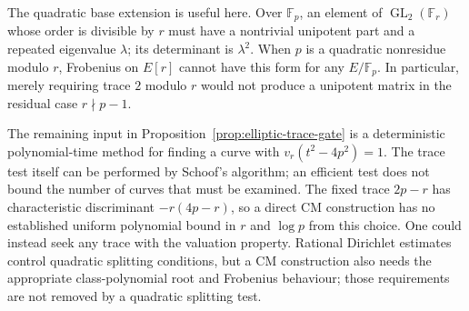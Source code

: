 \documentclass[11pt]{article}
\theoremstyle{definition}
\theoremstyle{remark}
\begin{document}
The quadratic base extension is useful here.
Over $\mathbb F_p$, an element of $\operatorname{GL}_2(\mathbb F_r)$
whose order is divisible by $r$ must have a nontrivial unipotent
part and a repeated eigenvalue $\lambda$; its determinant is
$\lambda^2$.
When $p$ is a quadratic nonresidue modulo $r$, Frobenius on
$E[r]$ cannot have this form for any $E/\mathbb F_p$.
In particular, merely requiring trace $2$ modulo $r$ would not
produce a unipotent matrix in the residual case $r\nmid p-1$.

The remaining input in Proposition~\ref{prop:elliptic-trace-gate} is
a deterministic polynomial-time method for finding a curve with
$v_r(t^2-4p^2)=1$.  The trace test itself can be performed by
Schoof's algorithm; an efficient test does not bound the number of
curves that must be examined.
The fixed trace $2p-r$ has characteristic discriminant
$-r(4p-r)$, so a direct CM construction has no established uniform
polynomial bound in $r$ and $\log p$ from this choice.
One could instead seek any trace with the valuation property.
Rational Dirichlet estimates control quadratic splitting conditions,
but a CM construction also needs the appropriate class-polynomial
root and Frobenius behaviour; those requirements are not removed by
a quadratic splitting test.
\end{document}

